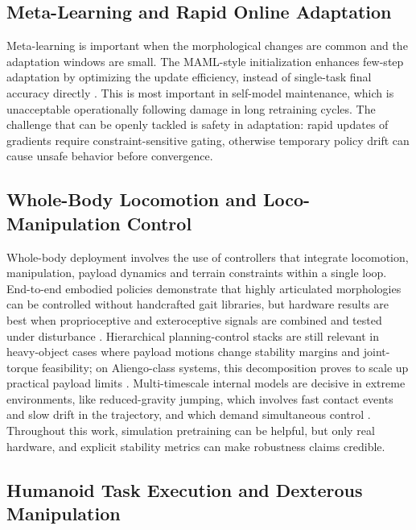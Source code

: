 \documentclass[11pt,a4paper]{article}
\begin{document}
\subsection{Meta-Learning and Rapid Online Adaptation}

Meta-learning is important when the morphological changes are common and the adaptation windows are small. The MAML-style initialization enhances few-step adaptation by optimizing the update efficiency, instead of single-task final accuracy directly \cite{finn2017maml}. This is most important in self-model maintenance, which is unacceptable operationally following damage in long retraining cycles. The challenge that can be openly tackled is safety in adaptation: rapid updates of gradients require constraint-sensitive gating, otherwise temporary policy drift can cause unsafe behavior before convergence.

\subsection{Whole-Body Locomotion and Loco-Manipulation Control}

Whole-body deployment involves the use of controllers that integrate locomotion, manipulation, payload dynamics and terrain constraints within a single loop. End-to-end embodied policies demonstrate that highly articulated morphologies can be controlled without handcrafted gait libraries, but hardware results are best when proprioceptive and exteroceptive signals are combined and tested under disturbance \cite{tian2024salamander,cui2025pilot}. Hierarchical planning-control stacks are still relevant in heavy-object cases where payload motions change stability margins and joint-torque feasibility; on Aliengo-class systems, this decomposition proves to scale up practical payload limits \cite{rigo2024hierarchical}. Multi-timescale internal models are decisive in extreme environments, like reduced-gravity jumping, which involves fast contact events and slow drift in the trajectory, and which demand simultaneous control \cite{xu2026dualhorizon}. Throughout this work, simulation pretraining can be helpful, but only real hardware, and explicit stability metrics can make robustness claims credible.

\subsection{Humanoid Task Execution and Dexterous Manipulation}
\end{document}
